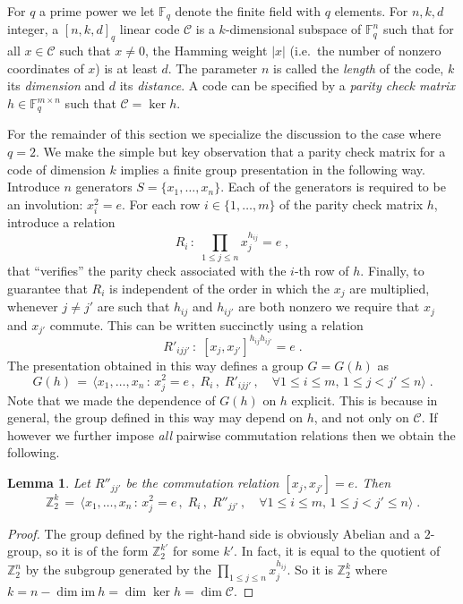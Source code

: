 \documentclass[11pt]{article}
\newtheorem{lemma}[theorem]{Lemma}
\theoremstyle{definition}
\newcommand{\code}{\mathscr{C}}
\newcommand{\F}{\ensuremath{\mathbb{F}}}
\newcommand{\Z}{\ensuremath{\mathbb{Z}}}
\begin{document}
For $q$ a prime power we let $\F_q$ denote the finite field with $q$ elements. 
For $n,k,d$ integer, a $[n,k,d]_q$ linear code $\code$ is a $k$-dimensional subspace of $\F_q^n$ such that for all $x\in \code$ such that $x\neq 0$, the Hamming weight $|x|$ (i.e.\ the number of nonzero coordinates of $x$) is at least $d$. The parameter $n$ is called the \emph{length} of the code, $k$ its \emph{dimension} and $d$ its \emph{distance}. A code can be specified by a \emph{parity check matrix} $h\in \F_q^{m\times n}$ such that $\code = \ker h$. 

For the remainder of this section we specialize the discussion to the case where $q=2$. 
We make the simple but key observation that a parity check matrix for a code of dimension $k$ implies a finite group presentation in the following way. Introduce $n$ generators $S=\{x_1,\ldots,x_n\}$. Each of the generators is required to be an involution: $x_i^2=e$. For each row $i\in \{1,\ldots,m\}$ of the parity check matrix $h$, introduce a relation 
\[ R_i\,:\; \prod_{1\leq j \leq n} x_j^{h_{ij}}=e\;, \]
that ``verifies'' the parity check associated with the $i$-th row of $h$. Finally, to guarantee that $R_i$ is independent of the order in which the $x_j$ are multiplied, whenever $j\neq j'$ are such that $h_{ij}$ and $h_{ij'}$ are both nonzero we require that $x_j$ and $x_{j'}$ commute. This can be written succinctly using a relation 
\[ R'_{ijj'}\,:\; [x_j,x_{j'}]^{h_{ij} h_{ij'}}=e\;.\]
The presentation obtained in this way defines a group $G=G(h)$ as 
\begin{equation}\label{eq:def-gh-pres}
 G(h) \,=\, \big\langle x_1,\ldots,x_n \,:\, x_j^2=e\,,\; R_i\,,\; R'_{ijj'}\,,\quad \forall 1\leq i\leq m,\, 1\leq j< j' \leq n\big\rangle\;.
\end{equation}
Note that we made the dependence of $G(h)$ on $h$ explicit. This is because in general, the group defined in this way may depend on $h$, and not only on $\code$. If however we further impose \emph{all} pairwise commutation relations then we obtain the following. 

\begin{lemma}\label{lem:com-code}
Let $R''_{jj'}$ be the commutation relation $[x_j,x_{j'}]=e$. Then
\[ \Z_2^k \,=\, \big\langle x_1,\ldots,x_n \,:\, x_j^2=e\,,\; R_i\,,\; R''_{jj'}\,,\quad \forall 1\leq i\leq m,\, 1\leq j< j' \leq n\big\rangle\;.\]
\end{lemma}

\begin{proof}
The group defined by the right-hand side is obviously Abelian and a $2$-group, so it is of the form $\Z_2^{k'}$ for some $k'$. In fact, it is equal to the quotient of $\Z_2^n$ by the subgroup generated by the $\prod_{1\leq j \leq n} x_j^{h_{ij}}$. So it is $\Z_2^k$ where $k=n-\dim\textrm{im}\ h = \dim\ker h=\dim \code$.  
\end{proof}
\end{document}
